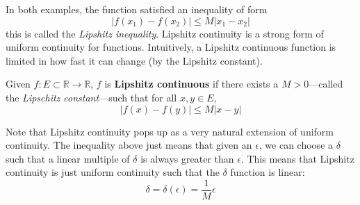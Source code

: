   In both examples, the function satisfied an inequality of form 
  \begin{equation}
    |f(x_1) - f(x_2)| \leq M |x_1 - x_2|
  \end{equation}
  this is called the \textit{Lipshitz inequality}. Lipshitz continuity is a strong form of uniform continuity for functions. Intuitively, a Lipshitz continuous function is limited in how fast it can change (by the Lipshitz constant). 

  \begin{definition}
    Given $f: E \subset \mathbb{R} \longrightarrow \mathbb{R}$, $f$ is \textbf{Lipshitz continuous} if there exists a $M > 0$---called the \textit{Lipschitz constant}---such that for all $x, y \in E$, 
    \begin{equation}
      |f(x) - f(y)| \leq M |x - y|
    \end{equation}
  \end{definition}

  Note that Lipshitz continuity pops up as a very natural extension of uniform continuity. The inequality above just means that given an $\epsilon$, we can choose a $\delta$ such that a linear multiple of $\delta$ is always greater than $\epsilon$. This means that Lipshitz continuity is just uniform continuity such that the $\delta$ function is linear:  
  \begin{equation}
    \delta = \delta(\epsilon) = \frac{1}{M} \epsilon
  \end{equation}

